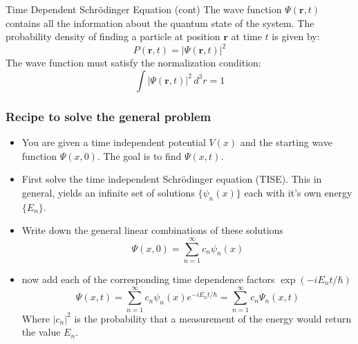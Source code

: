 \begin{frame}{Time Dependent Schrödinger Equation (cont)}
	The wave function $\Psi(\mathbf{r}, t)$ contains all the information about the quantum state of the system. The probability density of finding a particle at position $\mathbf{r}$ at time $t$ is given by:
	\begin{equation*}
		P(\mathbf{r}, t) = |\Psi(\mathbf{r}, t)|^2
	\end{equation*}
	The wave function must satisfy the normalization condition:
	\begin{equation*}
		\int |\Psi(\mathbf{r}, t)|^2 \, d^3r = 1
	\end{equation*}
\end{frame}

\begin{frame}
	\frametitle{Recipe to solve the general problem}

	\begin{itemize}
		\item You are given a time independent potential $V(x)$ and the starting wave function $\Psi (x,0)$. The goal is to find $\Psi(x,t)$.
		\item First solve the time independent Schrödinger equation (TISE). This in general, yields an infinite set of solutions $\{\psi_n(x)\}$ each with it's own energy $\{E_n\}$.
		\item Write down the general linear combinations of these solutions  $$ \Psi(x,0) = \sum_{n=1}^\infty c_n \psi_n(x)$$
		\item now add each of the corresponding time dependence factors $\exp(-i E_n t /\hbar)$
		      \begin{equation}
			      \label{eq:GeneralSol}
			      \Psi(x,t) = \sum_{n=1}^{\infty} c_n \psi_n(x) e^{-iE_n t/ \hbar} = \sum_{n=1}^{\infty} c_n \Psi_n(x,t)
		      \end{equation}
		      Where $|c_n|^2$ is the probability that a measurement of the energy would return the value $E_n$.
	\end{itemize}
\end{frame}
